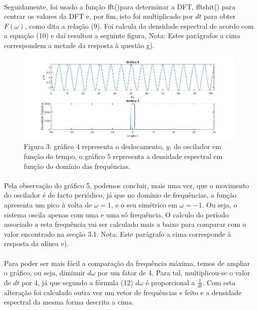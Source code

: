 \documentclass[a4paper, 11pt]{article}
\newcommand{\fft}{{\fontfamily{pcr}\selectfont fft()}}
\begin{document}
	\paragraph{}
	Seguidamente, foi usado a função \fft para determinar a DFT, {\selectfont fftshit()} para centrar os valores da DFT e, por fim, isto foi multiplicado por $dt$ para obter $F(\omega)$, como dita a relação (9). Foi calcula da densidade espectral de acordo com a equação (10) e daí resultou a seguinte figura, 
	\newline
	{\footnotesize Nota: Estes parágrafos a cima correspondem a metade da resposta à questão g).}
	\begin{figure}[h]
		\centering
		\captionsetup{labelformat=empty}
		\includegraphics[scale=0.4]{parteB_1}
		\caption{\scriptsize Figura 3: gráfico 4 representa o deslocamento, $y$, do oscilador em função do tempo, o gráfico 5 representa a densidade espectral em função do domínio das frequências.}
	\end{figure}
	\paragraph{}
	Pela observação do gráfico 5, podemos concluir, mais uma vez, que o movimento do oscilador é de facto periódico, já que no domínio de frequências, a função apresenta um pico à volta de $\omega=1$, e o seu simétrico em $\omega=-1$. Ou seja, o sistema oscila apenas com uma e uma só frequência. O calculo do período associado a esta frequência vai ser calculado mais a baixo para comparar com o valor encontrado na secção 3.1.
	\newline
	{\footnotesize Nota: Este parágrafo a cima corresponde à resposta da alínea e).}
	\paragraph{}
	Para poder ser mais fácil a comparação da frequência máxima, temos de ampliar o gráfico, ou seja, diminuir $d\omega$ por um fator de 4. Para tal, multiplicou-se o valor de $dt$ por 4, já que segundo a fórmula (12) $d\omega$ é proporcional a $\frac{1}{dt}$. Com esta alteração foi calculado outra vez um vetor de frequências e feito e a densidade espectral da mesma forma descrita a cima.
\end{document}
